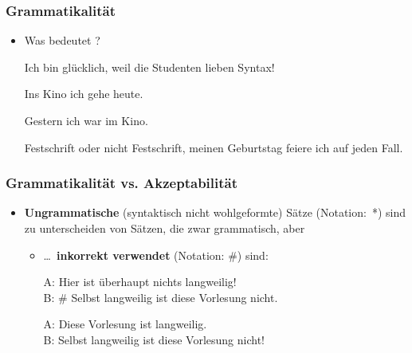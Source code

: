 
\begin{frame}
\frametitle{Grammatikalität}

\begin{itemize}
	
	\item Was bedeutet ?
	
	\ea Ich bin glücklich, weil die Studenten lieben Syntax!
	\z
	
	\ea Ins Kino ich gehe heute.
	\z
	
	\ea Gestern ich war im Kino.
	\z
	
	\ea Festschrift oder nicht Festschrift, meinen Geburtstag feiere ich auf jeden Fall. 
	\z
	
\nocite{Finkbeiner&Meibauer14a}
	
\end{itemize}

\end{frame}


\begin{frame}
\frametitle{Grammatikalität vs. Akzeptabilität}

\begin{itemize}
	\item \textbf{Ungrammatische} (syntaktisch nicht wohlgeformte) Sätze (Notation:~*) sind zu unterscheiden von Sätzen, die zwar grammatisch, aber
	
	\begin{itemize}
		\item \dots\ \textbf{inkorrekt verwendet} (Notation: \#) sind:

		\ea A: Hier ist überhaupt nichts langweilig!\\
		B: \# Selbst langweilig ist diese Vorlesung nicht.
		\z
\pause

		\ea A: Diese Vorlesung ist langweilig.\\
		B: Selbst langweilig ist diese Vorlesung nicht!
		\z
		
	\end{itemize}

\end{itemize}

\nocite{Coseriu88a, Fries15a, Repp&Co15a}

\end{frame}


